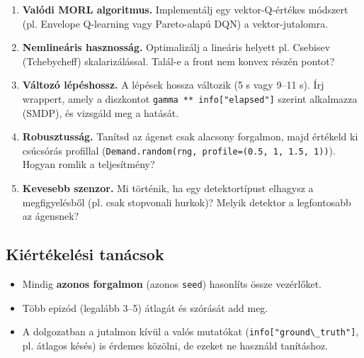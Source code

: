 \begin{enumerate}
\def\labelenumi{\arabic{enumi}.}
\setcounter{enumi}{5}
\tightlist
\item
  \textbf{Valódi MORL algoritmus.}
  Implementálj egy vektor-Q-értékes
  módszert (pl. Envelope Q-learning vagy
  Pareto-alapú DQN) a vektor-jutalomra.
\item
  \textbf{Nemlineáris hasznosság.}
  Optimalizálj a lineáris helyett pl.
  Csebisev (Tchebycheff)
  skalarizálással. Talál-e a front nem
  konvex részén pontot?
\item
  \textbf{Változó lépéshossz.} A lépések
  hossza változik (5 s vagy 9--11 s).
  Írj wrappert, amely a diszkontot
  \passthrough{\lstinline!gamma ** info["elapsed"]!}
  szerint alkalmazza (SMDP), és vizsgáld
  meg a hatását.
\item
  \textbf{Robusztusság.} Tanítsd az
  ágenst csak alacsony forgalmon, majd
  értékeld ki csúcsórás profillal
  (\passthrough{\lstinline!Demand.random(rng, profile=(0.5, 1, 1.5, 1))!}).
  Hogyan romlik a teljesítmény?
\item
  \textbf{Kevesebb szenzor.} Mi
  történik, ha egy detektortípust
  elhagysz a megfigyelésből (pl. csak
  stopvonali hurkok)? Melyik detektor a
  legfontosabb az ágensnek?
\end{enumerate}

\hypertarget{kiuxe9rtuxe9keluxe9si-tanuxe1csok}{%
\subsection{Kiértékelési
tanácsok}\label{kiuxe9rtuxe9keluxe9si-tanuxe1csok}}

\begin{itemize}
\tightlist
\item
  Mindig \textbf{azonos forgalmon}
  (azonos
  \passthrough{\lstinline!seed!})
  hasonlíts össze vezérlőket.
\item
  Több epizód (legalább 3--5) átlagát és
  szórását add meg.
\item
  A dolgozatban a jutalmon kívül a valós
  mutatókat
  (\passthrough{\lstinline!info["ground\_truth"]!},
  pl. átlagos késés) is érdemes közölni,
  de ezeket ne használd tanításhoz.
\end{itemize}
